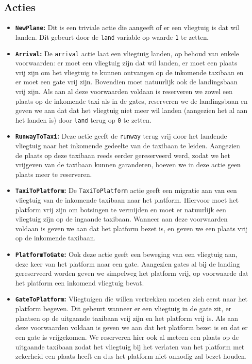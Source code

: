 \subsection{Acties}
\begin{itemize}
\item \textbf{\texttt{NewPlane}:} Dit is een triviale actie die aangeeft of er een vliegtuig is dat wil landen. Dit gebeurt door de \texttt{land} variable op waarde \texttt{1} te zetten.
\item \textbf{\texttt{Arrival}:} De \texttt{arrival} actie laat een vliegtuig landen, op behoud van enkele voorwaarden: er moet een vliegtuig zijn dat wil landen, er moet een plaats vrij zijn om het vliegtuig te kunnen ontvangen op de inkomende taxibaan en er moet een gate vrij zijn. Bovendien moet natuurlijk ook de landingsbaan vrij zijn. Als aan al deze voorwaarden voldaan is reserveren we zowel een plaats op de inkomende taxi als in de gates, reserveren we de landingsbaan en geven we aan dat dat het vliegtuig niet meer wil landen (aangezien het al aan het landen is) door \texttt{land} terug op \texttt{0} te zetten.
\item \textbf{\texttt{RunwayToTaxi}:} Deze actie geeft de \texttt{runway} terug vrij door het landende vliegtuig naar het inkomende gedeelte van de taxibaan te leiden. Aangezien de plaats op deze taxibaan reeds eerder gereserveerd werd, zodat we het vrijgeven van de taxibaan kunnen garanderen, hoeven we in deze actie geen plaats meer te reserveren.
\item \textbf{\texttt{TaxiToPlatform}:} De \texttt{TaxiToPlatform} actie geeft een migratie aan van een vliegtuig van de inkomende taxibaan naar het platform. Hiervoor moet het platform vrij zijn om botsingen te vermijden en moet er natuurlijk een vliegtuig zijn op de ingaande taxibaan. Wanneer aan deze voorwaarden voldaan is geven we aan dat het platform bezet is, en geven we een plaats vrij op de inkomende taxibaan.
\item \textbf{\texttt{PlatformToGate}:} Ook deze actie geeft een beweging van een vliegtuig aan, deze keer van het platform naar een gate. Aangezien gates al bij de landing gereserveerd worden geven we simpelweg het platform vrij, op voorwaarde dat het platform een inkomend vliegtuig bevat.
\item \textbf{\texttt{GateToPlatform}:} Vliegtuigen die willen vertrekken moeten zich eerst naar het platform begeven. Dit gebeurt wanneer er een vliegtuig in de gate zit, er plaatsen op de uitgaande taxibaan vrij zijn en het platform vrij is. Als aan deze voorwaarden voldaan is geven we aan dat het platform bezet is en dat er een gate is vrijgekomen. We reserveren hier ook al meteen een plaats op de uitgaande taxibaan zodat het vliegtuig bij het verlaten van het platform met zekerheid een plaats heeft en dus het platform niet onnodig zal bezet houden.

\end{itemize}
